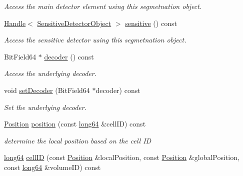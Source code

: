 \begin{DoxyCompactItemize}
\begin{DoxyCompactList}\small\item\em Access the main detector element using this segmetnation object. \item\end{DoxyCompactList}\item 
\hyperlink{class_d_d4hep_1_1_handle}{Handle}$<$ \hyperlink{class_d_d4hep_1_1_geometry_1_1_sensitive_detector_object}{SensitiveDetectorObject} $>$ \hyperlink{class_d_d4hep_1_1_geometry_1_1_segmentation_a17d311aaf6a17fe6f07d9239eee97be2}{sensitive} () const 
\begin{DoxyCompactList}\small\item\em Access the sensitive detector using this segmetnation object. \item\end{DoxyCompactList}\item 
BitField64 $\ast$ \hyperlink{class_d_d4hep_1_1_geometry_1_1_segmentation_a298f8573f7781e5bf42aa37c12c2152b}{decoder} () const 
\begin{DoxyCompactList}\small\item\em Access the underlying decoder. \item\end{DoxyCompactList}\item 
void \hyperlink{class_d_d4hep_1_1_geometry_1_1_segmentation_a618226ff887a018f8176a0d232882580}{setDecoder} (BitField64 $\ast$decoder) const 
\begin{DoxyCompactList}\small\item\em Set the underlying decoder. \item\end{DoxyCompactList}\item 
\hyperlink{namespace_d_d4hep_1_1_geometry_a55083902099d03506c6db01b80404900}{Position} \hyperlink{class_d_d4hep_1_1_geometry_1_1_segmentation_a3449910fbeb0c8067f75d88fa66b185f}{position} (const \hyperlink{namespace_d_d4hep_ac2a70e722b33dc7ddaa20db8954ac836}{long64} \&cellID) const 
\begin{DoxyCompactList}\small\item\em determine the local position based on the cell ID \item\end{DoxyCompactList}\item 
\hyperlink{namespace_d_d4hep_ac2a70e722b33dc7ddaa20db8954ac836}{long64} \hyperlink{class_d_d4hep_1_1_geometry_1_1_segmentation_abbcc6a9e5794b6e0e66001afd2ff8595}{cellID} (const \hyperlink{namespace_d_d4hep_1_1_geometry_a55083902099d03506c6db01b80404900}{Position} \&localPosition, const \hyperlink{namespace_d_d4hep_1_1_geometry_a55083902099d03506c6db01b80404900}{Position} \&globalPosition, const \hyperlink{namespace_d_d4hep_ac2a70e722b33dc7ddaa20db8954ac836}{long64} \&volumeID) const 

\end{DoxyCompactItemize}
